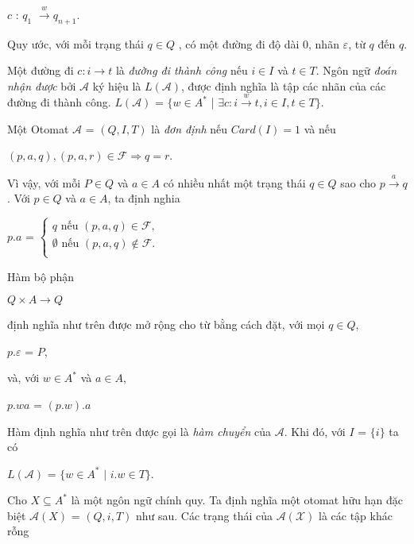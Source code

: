 $c$ : $q_1$ $\xrightarrow{w} q_{n+1}.$
\begin{flushleft}
    Quy ước, với mỗi trạng thái $q \in Q$ , có một đường đi độ dài 0, nhãn $\varepsilon$, từ $q$ đến $q$. 
\end{flushleft}
\begin{flushleft}
\hspace{10mm}Một đường đi $c : i \to t$ là \textit{đường đi thành công} nếu $i \in I$ và $t \in T$. Ngôn ngữ \textit{đoán nhận được} bởi $\mathcal{A}$ ký hiệu là $L(\mathcal{A})$, được định nghĩa là tập các nhãn của các đường đi thành công. $L(\mathcal{A})$ = $\{ w \in A^* $ | $ \exists c : i \xrightarrow{w} t, i \in I, t\in T \}$.
\end{flushleft}
\begin{flushleft}
\hspace{10mm}Một Otomat $\mathcal{A}$ = $(Q, I, T)$ là \textit{đơn định} nếu $Card(I)=1$ và nếu  
\end{flushleft}
$(p,a,q),(p,a,r) \in \mathcal{F} \Rightarrow q = r$.
\begin{flushleft}
\hspace{10mm}Vì vậy, với mỗi $P \in Q$ và $a \in A$ có nhiều nhất một trạng thái $q \in Q$ sao cho $p \xrightarrow{a} q$. Với $p \in Q$ và $a \in A$, ta định nghia 
\end{flushleft}
$p.a$ = $\begin{cases}
    q \text{  nếu  } (p,a,q ) \in \mathcal{F},\\
    \emptyset \text{  nếu  } (p,a,q) \not\in \mathcal{F}.\\ 
\end{cases}$
\begin{flushleft}
    Hàm bộ phận
\end{flushleft}
$Q \times A \to Q$
\begin{flushleft}
định nghĩa như trên được mở rộng cho từ bằng cách đặt, với mọi $q \in Q$,
\end{flushleft}
$p.\varepsilon$ = $P$,
\begin{flushleft}
và, với $w \in A^*$ và $a \in A$, 
\end{flushleft}
$p.wa$ = $(p.w).a$
\begin{flushleft}
Hàm định nghĩa như trên được gọi là \textit{hàm chuyển} của $\mathcal{A}$. Khi đó, với $I$ = $\{ i \}$ ta có
\end{flushleft}
$L(\mathcal{A})$ = $\{ w \in A^* \text{ | } i.w \in T \}$.
\begin{flushleft}
\hspace{10mm}Cho $X \subseteq A^*$ là một ngôn ngữ chính quy. Ta định nghĩa một otomat hữu hạn đặc biệt $\mathcal{A}(X)$ = $(Q, i, T)$ như sau. Các trạng thái của $\mathcal{A(X)}$ là các tập khác rỗng 
\end{flushleft}
